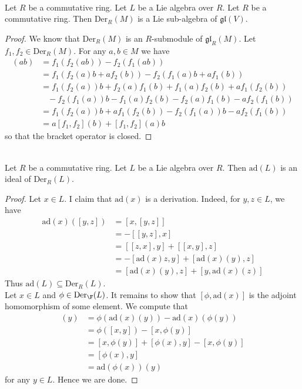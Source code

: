 \documentclass[a4paper]{article}
\begin{document}
\begin{lmm}{}{}\\
Let $R$ be a commutative ring. Let $L$ be a Lie algebra over $R$. Let $R$ be a commutative ring. Then $\text{Der}_R(M)$ is a Lie sub-algebra of $\mathfrak{gl}(V)$. 
\begin{proof}
We know that $\text{Der}_R(M)$ is an $R$-submodule of $\mathfrak{gl}_R(M)$. Let $f_1,f_2\in\text{Der}_R(M)$. For any $a,b\in M$ we have 
\begin{align*}
[f_1,f_2](ab)&=f_1(f_2(ab))-f_2(f_1(ab))\\
&=f_1(f_2(a)b+af_2(b))-f_2(f_1(a)b+af_1(b))\\
&=f_1(f_2(a))b+f_2(a)f_1(b)+f_1(a)f_2(b)+af_1(f_2(b))\\
&\;\;\;-f_2(f_1(a))b-f_1(a)f_2(b)-f_2(a)f_1(b)-af_2(f_1(b))\\
&=f_1(f_2(a))b+af_1(f_2(b))-f_2(f_1(a))b-af_2(f_1(b))\\
&=a[f_1,f_2](b)+[f_1,f_2](a)b
\end{align*}
so that the bracket operator is closed. 
\end{proof}
\end{lmm}

\begin{lmm}{}{}\\
Let $R$ be a commutative ring. Let $L$ be a Lie algebra over $R$. Then $\text{ad}(L)$ is an ideal of $\text{Der}_R(L)$. 
\begin{proof}
Let $x\in L$. I claim that $\text{ad}(x)$ is a derivation. Indeed, for $y,z\in L$, we have 
\begin{align*}
\text{ad}(x)([y,z])&=[x,[y,z]]\\
&=-[[y,z],x]\\
&=[[z,x],y]+[[x,y],z]\\
&=-[\text{ad}(x)z,y]+[\text{ad}(x)(y),z]\\
&=[\text{ad}(x)(y),z]+[y,\text{ad}(x)(z)]
\end{align*}
Thus $\text{ad}(L)\subseteq\text{Der}_R(L)$. \\

Let $x\in L$ and $\phi\in\text{Der}_\F(L)$. It remains to show that $[\phi,\text{ad}(x)]$ is the adjoint homomorphism of some element. We compute that 
\begin{align*}
[\phi,\text{ad}(x)](y)&=\phi(\text{ad}(x)(y))-\text{ad}(x)(\phi(y))\\
&=\phi([x,y])-[x,\phi(y)]\\
&=[x,\phi(y)]+[\phi(x),y]-[x,\phi(y)]\\
&=[\phi(x),y]\\
&=\text{ad}(\phi(x))(y)
\end{align*}
for any $y\in L$. Hence we are done. 
\end{proof}
\end{lmm}
\end{document}
